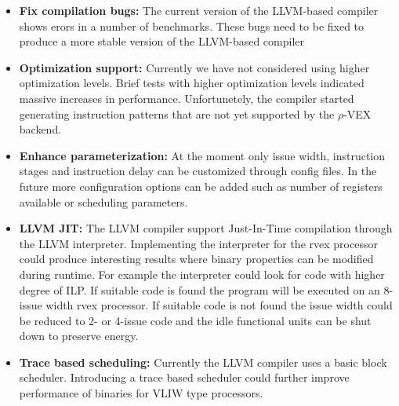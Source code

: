 \begin{itemize}
	\item \textbf{Fix compilation bugs:}  The current version of the LLVM-based compiler shows erors in a number of benchmarks. These bugs need to be fixed to produce a more stable version of the LLVM-based compiler

	\item \textbf{Optimization support:} Currently we have not considered using higher optimization levels. Brief tests with higher optimization levels indicated massive increases in performance. Unfortunetely, the compiler started generating instruction patterns that are not yet supported by the $\rho$-VEX backend.

	\item \textbf{Enhance parameterization:} At the moment only issue width, instruction stages and instruction delay can be customized through config files. In the future more configuration options can be added such as number of registers available or scheduling parameters.

	\item \textbf{LLVM JIT:} The LLVM compiler support Just-In-Time compilation through the LLVM interpreter. Implementing the interpreter for the rvex processor could produce interesting results where binary properties can be modified during runtime. For example the interpreter could look for code with higher degree of ILP. If suitable code is found the program will be executed on an 8-issue width rvex processor. If suitable code is not found the issue width could be reduced to 2- or 4-issue code and the idle functional units can be shut down to preserve energy.

	\item \textbf{Trace based scheduling:} Currently the LLVM compiler uses a basic block scheduler. Introducing a trace based scheduler could further improve performance of binaries for VLIW type processors.

\end{itemize}

\acresetall